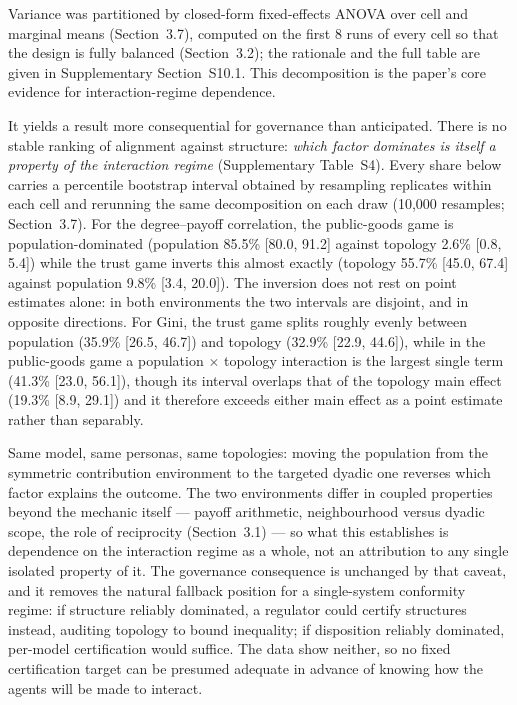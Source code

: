 \documentclass[11pt,a4paper]{article}
\begin{document}
Variance was partitioned by closed-form fixed-effects ANOVA over cell
and marginal means (Section~3.7), computed on the first 8 runs of
every cell so that the design is fully balanced (Section~3.2); the
rationale and the full table are given in Supplementary
Section~S10.1. This decomposition is the paper's core evidence for
interaction-regime dependence.

It yields a result more consequential for governance
than anticipated. There is no stable ranking of alignment against
structure: \emph{which factor dominates is itself a property of the
interaction regime} (Supplementary Table~S4). Every share below
carries a percentile bootstrap interval obtained by resampling
replicates within each cell and rerunning the same decomposition on
each draw (10,000 resamples; Section~3.7). For the degree--payoff
correlation, the public-goods game is population-dominated
(population 85.5\% [80.0, 91.2] against topology 2.6\% [0.8, 5.4])
while the trust game inverts this almost exactly (topology 55.7\%
[45.0, 67.4] against population 9.8\% [3.4, 20.0]). The inversion does
not rest on point estimates alone: in both environments the two
intervals are disjoint, and in opposite directions. For Gini, the
trust game splits roughly evenly between population (35.9\%
[26.5, 46.7]) and topology (32.9\% [22.9, 44.6]), while in the
public-goods game a population $\times$ topology interaction is the
largest single term (41.3\% [23.0, 56.1]), though its interval
overlaps that of the topology main effect (19.3\% [8.9, 29.1]) and it
therefore exceeds either main effect as a point estimate rather than
separably.

Same model, same personas, same topologies: moving the population from
the symmetric contribution environment to the targeted dyadic one
reverses which factor explains the outcome. The two environments differ in coupled
properties beyond the mechanic itself --- payoff arithmetic,
neighbourhood versus dyadic scope, the role of reciprocity
(Section~3.1) --- so what this establishes is dependence on the
interaction regime as a whole, not an attribution to any single
isolated property of it. The governance consequence is unchanged by
that caveat, and it removes the natural fallback
position for a single-system conformity regime: if structure reliably
dominated, a regulator could certify structures instead, auditing
topology to bound inequality; if disposition reliably dominated,
per-model certification would suffice. The data show neither, so no
fixed certification target can be presumed adequate in advance of
knowing how the agents will be made to interact.
\end{document}
